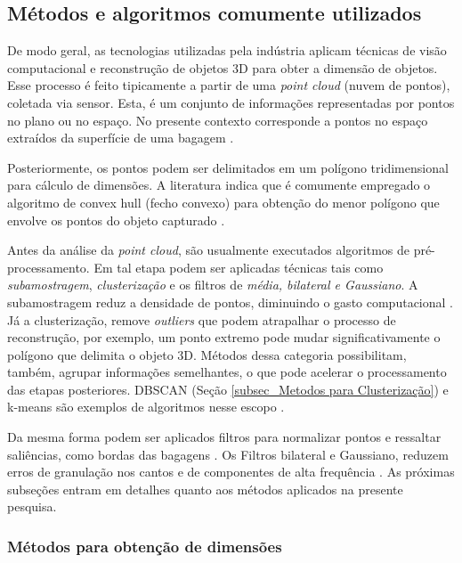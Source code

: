 \subsection{Métodos e algoritmos comumente utilizados}
\label{sec_Metodos e algoritmos comumente utilizados}

    De modo geral, as tecnologias utilizadas pela indústria aplicam técnicas de visão computacional e reconstrução de objetos 3D para obter a dimensão de objetos. Esse processo é feito tipicamente a partir de uma \textit{\textit{point cloud}} (nuvem de pontos), coletada via sensor. Esta, é um conjunto de informações representadas por pontos no plano ou no espaço. No presente contexto corresponde a pontos no espaço extraídos da superfície de uma bagagem \cite{chen_2013_research}.
    
    Posteriormente, os pontos podem ser delimitados em um polígono tridimensional para cálculo de dimensões. A literatura indica que é comumente empregado o algoritmo de convex hull (fecho convexo) para obtenção do menor polígono que envolve os pontos do objeto capturado \cite{neethu_2015_role, gao_2018_minimum, ding_2018_a}.

    Antes da análise da \textit{point cloud}, são usualmente executados algoritmos de pré-processamento. Em tal etapa podem ser aplicadas técnicas tais como \textit{subamostragem}, \textit{clusterização} e os filtros de \textit{média, bilateral e Gaussiano}. A subamostragem reduz a densidade de pontos, diminuindo o gasto computacional \cite{ruchay_2018_fusion}. Já a clusterização, remove \textit{outliers} que podem atrapalhar o processo de reconstrução, por exemplo, um ponto extremo pode mudar significativamente o polígono que delimita o objeto 3D. Métodos dessa categoria	  possibilitam, também, agrupar informações semelhantes, o que pode acelerar o processamento das etapas posteriores. DBSCAN (Seção \ref{subsec_Metodos para Clusterização}) e k-means são exemplos de algoritmos nesse escopo \cite{limwattanapibool_2017_determination}. 

    Da mesma forma podem ser aplicados filtros para normalizar pontos e ressaltar saliências, como bordas das bagagens \cite{ruchay_2018_fusion}.  Os Filtros bilateral e Gaussiano, reduzem erros de granulação nos cantos e de componentes de alta frequência \cite{shin_2014_implementation, wan_2012_a}. As próximas subseções entram em detalhes quanto aos métodos aplicados na presente pesquisa.

\subsubsection{Métodos para obtenção de dimensões}
\label{subsec_Metodos para obtenção de dimensões}

